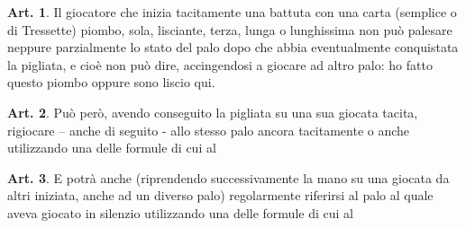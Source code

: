 \documentclass[italian,a4paper]{article}
\theoremstyle{definition}
\newtheorem{art}{Art.}
\begin{document}
\begin{art}
Il giocatore che inizia tacitamente una battuta con una carta (semplice o di
Tressette) piombo, sola, lisciante, terza, lunga o lunghissima non può
palesare neppure parzialmente lo stato del palo dopo che abbia eventualmente
conquistata la pigliata, e cioè non può dire, accingendosi a giocare ad
altro palo: ho fatto questo piombo oppure sono liscio qui.
\end{art}

\begin{art}
Può però, avendo conseguito la pigliata su una sua giocata tacita, rigiocare
– anche di seguito - allo stesso palo ancora tacitamente o anche utilizzando
una delle formule di cui al 
\end{art}

\begin{art}
E potrà anche (riprendendo successivamente la mano su una giocata da altri
iniziata, anche ad un diverso palo) regolarmente riferirsi al palo al quale
aveva giocato in silenzio utilizzando una delle formule di cui al
\end{art}
\end{document}
